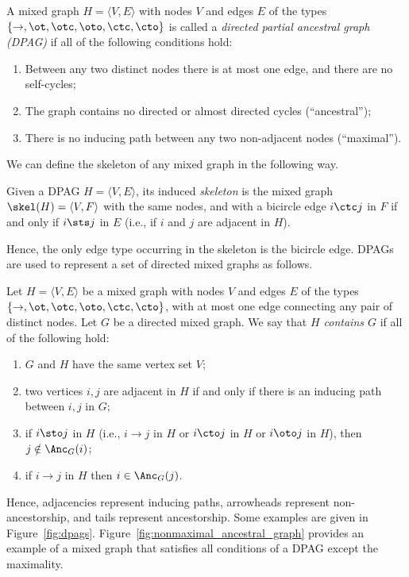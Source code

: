 \begin{Def}\label{def:dpag}
  A mixed graph $H = \langle V,E\rangle$ with nodes $V$ and edges $E$ of the types $\{\to,\ot,\otc,\oto,\ctc,\cto\}$ is called a \emph{directed partial ancestral graph (DPAG)} if all of the following conditions hold:
  \begin{enumerate}
    \item Between any two distinct nodes there is at most one edge, and there are no self-cycles;
    \item The graph contains no directed or almost directed cycles (``ancestral'');
    \item There is no inducing path between any two non-adjacent nodes (``maximal'').
  \end{enumerate}
\end{Def}
We can define the skeleton of any mixed graph in the following way.
\begin{Def}\label{def:skeleton}
Given a DPAG $H = \langle V, E \rangle$, its induced \emph{skeleton} is the mixed graph 
$\skel(H) = \langle V, F \rangle$ with the same nodes, and with a bicircle edge $i \ctc j$ in $F$
  if and only if $i \sts j$ in $E$ (i.e., if $i$ and $j$ are adjacent in $H$).
\end{Def}
Hence, the only edge type occurring in the skeleton is the bicircle edge.
DPAGs are used to represent a set of directed mixed graphs as follows.
\begin{Def}\label{def:dpag_contains_dmg}
  Let $H = \langle V,E\rangle$ be a mixed graph with nodes $V$ and edges $E$ of the types $\{\to,\ot,\otc,\oto,\ctc,\cto\}$, with at most one edge connecting any pair of distinct nodes.
  Let $G$ be a directed mixed graph.
  We say that \emph{$H$ contains $G$} if all of the following hold:
  \begin{enumerate}
    \item $G$ and $H$ have the same vertex set $V$;
    \item two vertices $i,j$ are adjacent in $H$ if and only if there is an inducing path between $i,j$ in $G$;
    \item if $i \sto j$ in $H$ (i.e., $i \to j$ in $H$ or $i \cto j$ in $H$ or $i \oto j$ in $H$), then $j \notin \Anc_{G}(i)$;
    \item if $i \to j$ in $H$ then $i \in \Anc_{G}(j)$.
  \end{enumerate}
\end{Def}
Hence, adjacencies represent inducing paths, arrowheads represent non-ancestorship, and tails represent ancestorship.
Some examples are given in Figure~\ref{fig:dpags}. 
Figure~\ref{fig:nonmaximal_ancestral_graph} provides an example of a mixed graph that satisfies all conditions of a DPAG except the maximality.

